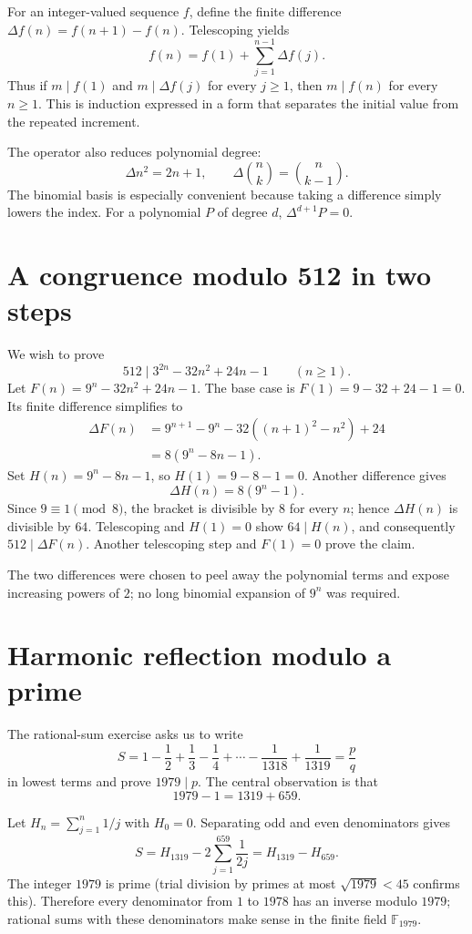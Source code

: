 For an integer-valued sequence \(f\), define the finite difference \(\Delta f(n)=f(n+1)-f(n)\). Telescoping yields
\[
 f(n)=f(1)+\sum_{j=1}^{n-1}\Delta f(j).
\]
Thus if \(m\mid f(1)\) and \(m\mid\Delta f(j)\) for every \(j\ge1\), then \(m\mid f(n)\) for every \(n\ge1\). This is induction expressed in a form that separates the initial value from the repeated increment.

The operator also reduces polynomial degree:
\[
 \Delta n^2=2n+1,\qquad
 \Delta \binom nk=\binom n{k-1}.
\]
The binomial basis is especially convenient because taking a difference simply lowers the index. For a polynomial \(P\) of degree \(d\), \(\Delta^{d+1}P=0\).

\section{A congruence modulo 512 in two steps}

We wish to prove
\[
 \boxed{512\mid 3^{2n}-32n^2+24n-1\qquad(n\ge1).}
\]
Let \(F(n)=9^n-32n^2+24n-1\). The base case is \(F(1)=9-32+24-1=0\). Its finite difference simplifies to
\[
\begin{aligned}
 \Delta F(n)
 &=9^{n+1}-9^n-32((n+1)^2-n^2)+24\\
 &=8(9^n-8n-1).
\end{aligned}
\]
Set \(H(n)=9^n-8n-1\), so \(H(1)=9-8-1=0\). Another difference gives
\[
 \Delta H(n)=8(9^n-1).
\]
Since \(9\equiv1\pmod8\), the bracket is divisible by \(8\) for every \(n\); hence \(\Delta H(n)\) is divisible by \(64\). Telescoping and \(H(1)=0\) show \(64\mid H(n)\), and consequently \(512\mid\Delta F(n)\). Another telescoping step and \(F(1)=0\) prove the claim.

The two differences were chosen to peel away the polynomial terms and expose increasing powers of \(2\); no long binomial expansion of \(9^n\) was required.

\section{Harmonic reflection modulo a prime}

The rational-sum exercise asks us to write
\[
 S=1-\frac12+\frac13-\frac14+\cdots-\frac1{1318}+\frac1{1319}
 =\frac pq
\]
in lowest terms and prove \(1979\mid p\). The central observation is that
\[
 1979-1=1319+659.
\]

Let \(H_n=\sum_{j=1}^n1/j\) with \(H_0=0\). Separating odd and even denominators gives
\[
 S=H_{1319}-2\sum_{j=1}^{659}\frac1{2j}
 =H_{1319}-H_{659}.
\]
The integer \(1979\) is prime (trial division by primes at most \(\sqrt{1979}<45\) confirms this). Therefore every denominator from \(1\) to \(1978\) has an inverse modulo \(1979\); rational sums with these denominators make sense in the finite field \(\mathbb F_{1979}\).

